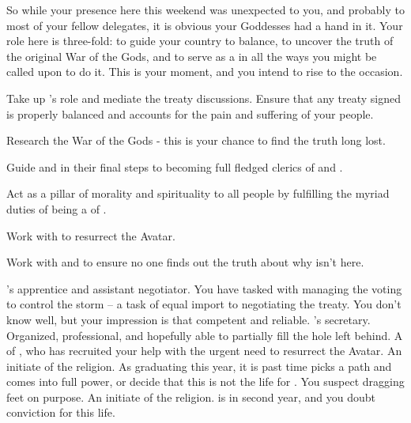 \documentclass[char]{GL2020}
\begin{document}
So while your presence here this weekend was unexpected to you, and probably to most of your fellow delegates, it is obvious your Goddesses had a hand in it. Your role here is three-fold: to guide your country to balance, to uncover the truth of the original War of the Gods, and to serve as a \cEbbPriest{\cleric} in all the ways you might be called upon to do it. This is your moment, and you intend to rise to the occasion.

\begin{itemz}[Goals]
	\item Take up \cHeadDiplomat{}’s role and mediate the treaty discussions. Ensure that any treaty signed is properly balanced and accounts for the pain and suffering of your people.
	\item Research the War of the Gods - this is your chance to find the truth long lost.
	\item Guide \cInitiate{} and \cWarlordDaughter{} in their final steps to becoming full fledged clerics of \cEbb{} and \cFlow{}.
	\item Act as a pillar of morality and spirituality to all people by fulfilling the myriad duties of being a \cEbbPriest{\cleric} of \cEbb{\full}.
	\item Work with \cFlowPriest{} to resurrect the \cEbb{} Avatar.
	\item Work with \cJuniorStatesman{} and \cChupLeader{} to ensure no one finds out the truth about why \cHeadDiplomat{} isn’t here.
\end{itemz}

\begin{itemz}[Notes]
	\item 
\end{itemz}

\begin{contacts}
	\contact{\cJuniorStatesman{}} \cHeadDiplomat{}’s apprentice and assistant negotiator. You have tasked \cJuniorStatesman{} with managing the voting to control the storm -- a task of equal import to negotiating the treaty. You don’t know \cJuniorStatesman{\them} well, but your impression is that \cJuniorStatesman{\theyare} competent and reliable.
	\contact{\cChupLeader{}} \cHeadDiplomat{}’s secretary. Organized, professional, and hopefully able to partially fill the hole \cHeadDiplomat{} left behind.
	\contact{\cFlowPriest{}} A \cFlowPriest{\cleric} of \cFlow{}, who has recruited your help with the urgent need to resurrect the \cEbb{} Avatar.
\contact{\cInitiate{}} An initiate of the \pShippies{} religion. As \cInitiate{\they} \cInitiate{\are} graduating this year, it is past time \cInitiate{} picks a path and comes into \cInitiate{\their} full power, or decide that this is not the life for \cInitiate{\them}. You suspect \cInitiate{\they} \cInitiate{\are} dragging \cInitiate{\their} feet on purpose.
\contact{\cWarlordDaughter{}} An initiate of the \pShippies{} religion. \cWarlordDaughter{} is in \cWarlordDaughter{\their} second year, and you doubt  conviction for this life.

\end{contacts}
\end{document}
